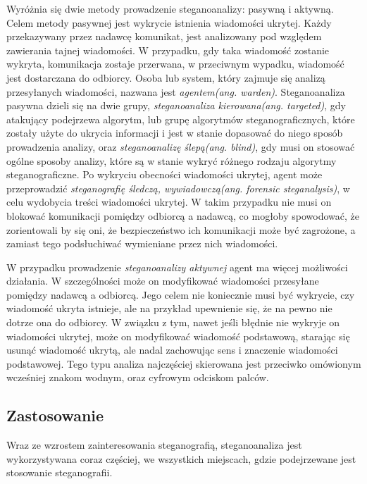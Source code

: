 \documentclass[a4paper, twoside, 12pt]{report}
\begin{document}
        Wyróżnia się dwie metody prowadzenie steganoanalizy: pasywną i aktywną.
        Celem metody pasywnej jest wykrycie istnienia wiadomości ukrytej. Każdy przekazywany
        przez nadawcę komunikat, jest analizowany pod względem zawierania tajnej wiadomości.
        W przypadku, gdy taka wiadomość zostanie wykryta, komunikacja zostaje przerwana,
        w przeciwnym wypadku, wiadomość jest dostarczana do odbiorcy. Osoba lub system,
        który zajmuje się analizą przesyłanych wiadomości, nazwana jest \emph{agentem(ang. warden)}.
        Steganoanaliza pasywna dzieli się na dwie grupy, \emph{steganoanaliza kierowana(ang. targeted)}, gdy
        atakujący podejrzewa algorytm, lub grupę algorytmów steganograficznych,
        które zostały użyte do ukrycia informacji i jest w stanie dopasować do
        niego sposób prowadzenia analizy, oraz \emph{steganoanalizę ślepą(ang. blind)},
        gdy musi on stosować ogólne sposoby analizy, które są w stanie wykryć różnego
        rodzaju algorytmy steganograficzne. Po wykryciu obecności wiadomości ukrytej,
        agent może przeprowadzić \emph{steganografię śledczą, wywiadowczą(ang. forensic steganalysis)},
        w celu wydobycia treści wiadomości ukrytej. W takim przypadku nie musi on
        blokować komunikacji pomiędzy odbiorcą a nadawcą, co mogłoby spowodować,
        że zorientowali by się oni, że bezpieczeństwo ich komunikacji może być zagrożone,
        a zamiast tego podsłuchiwać wymieniane przez nich wiadomości.

        W przypadku prowadzenie \emph{steganoanalizy aktywnej} agent ma więcej możliwości
        działania. W szczególności może on modyfikować wiadomości przesyłane pomiędzy
        nadawcą a odbiorcą. Jego celem nie koniecznie musi być wykrycie, czy wiadomość
        ukryta istnieje, ale na przykład upewnienie się, że na pewno nie dotrze ona
        do odbiorcy. W związku z tym, nawet jeśli błędnie nie wykryje on wiadomości ukrytej,
        może on modyfikować wiadomość podstawową, starając się usunąć wiadomość ukrytą,
        ale nadal zachowując sens i znaczenie wiadomości podstawowej. Tego typu analiza
        najczęściej skierowana jest przeciwko omówionym wcześniej znakom wodnym,
        oraz cyfrowym odciskom palców.\cite[Rozdział 13]{DIGITALWATERMARKING}

        \subsection{Zastosowanie}
        Wraz ze wzrostem zainteresowania steganografią, steganoanaliza jest wykorzystywana
        coraz częściej, we wszystkich miejscach, gdzie podejrzewane jest stosowanie
        steganografii.
\end{document}
